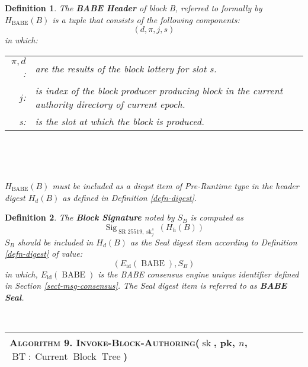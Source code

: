 \documentclass{book}
\newcommand{\tmname}[1]{\textsc{#1}}
\newcommand{\tmop}[1]{\ensuremath{\operatorname{#1}}}
\newcommand{\tmstrong}[1]{\textbf{#1}}
\newcommand{\tmtextbf}[1]{{\bfseries{#1}}}
\newcommand{\tmtextsc}[1]{{\scshape{#1}}}
\newcommand{\tmtexttt}[1]{{\ttfamily{#1}}}
\newcommand{\tmverbatim}[1]{{\ttfamily{#1}}}
\newcounter{tmcounter}
\newcommand{\custombinding}[1]{%
  \setcounter{tmcounter}{#1}%
  \addtocounter{tmcounter}{-1}%
  \refstepcounter{tmcounter}}
\newtheorem{definition}{Definition}
\providecommand{\tmname}[1]{\tmtextsc{#1}}
\providecommand{\tmop}[1]{\ensuremath{\mathrm{#1}}}
\providecommand{\tmstrong}[1]{\tmtextbf{#1}}
\providecommand{\tmtextbf}[1]{\tmtextbf{#1}}
\providecommand{\tmverbatim}[1]{\tmtexttt{#1}}
\newtheorem{definition}{Definition}
\begin{document}
\begin{definition}
  The \label{defn-babe-header}{\tmstrong{BABE Header}} of block B, referred to
  formally by {\tmstrong{$H_{\tmop{BABE}} (B)$}} is a tuple that consists of
  the following components:
  \[ (d, \pi, j, s) \]
  in which:
  
  \begin{center}
    \begin{tabular}{rl}
      $\pi, d$: & are the results of the block lottery for slot s. \\
      $j$: & is index of the block producer producing block in the current
      authority directory of current epoch. \\
      s: & is the slot at which the block is produced.
    \end{tabular}
    
    \ 
  \end{center}
  
  \
  
  $H_{\tmop{BABE}} (B)$ must be included as a diegst item of Pre-Runtime type
  in the header digest $H_d (B)$ as defined in Definition \ref{defn-digest}. 
\end{definition}

\begin{definition}
  \label{defn-block-signature}\label{defn-babe-seal}The {\tmstrong{Block
  Signature}} noted by $S_B$ is computed as
  \[ \tmop{Sig}_{\tmop{SR} 25519, \tmop{sk}^s_j} (H_h (B)) \]
  $S_B$ should be included in $H_d (B)$ as the Seal digest item according to
  Definition \ref{defn-digest} of value:
  \[ (E_{\tmop{id}} (\tmop{BABE}), S_B) \]
  in which, $E_{\tmop{id}} (\tmop{BABE})$ is the BABE consensus engine unique
  identifier defined in Section \ref{sect-msg-consensus}. The Seal digest item
  is referred to as {\tmstrong{BABE Seal}}.
  
  \ 
\end{definition}

\custombinding{9}{\noindent}\begin{tabular}{l}
  \hline
  \tmtextsc{Algorithm  9. }
  \label{algo-block-production}\tmverbatim{}{\tmname{Invoke-Block-Authoring}}($\tmop{sk}$,
  pk, $n$, $\tmop{BT} : \tmop{Current} \tmop{Block} \tmop{Tree}$)\\
  \hline
\end{tabular}
\end{document}
